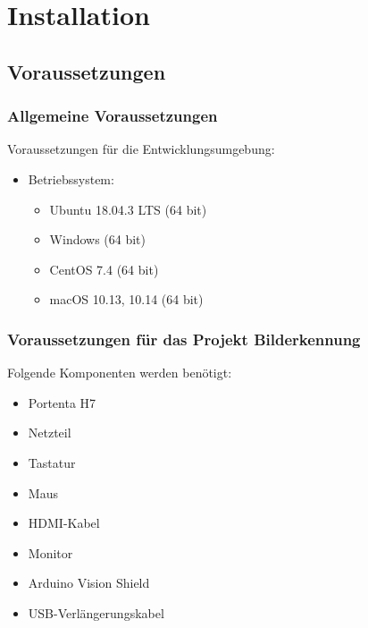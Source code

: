 %
%
%


\chapter{Installation}

\section{Voraussetzungen}

\subsection{Allgemeine Voraussetzungen}


Voraussetzungen für die Entwicklungsumgebung:
\begin{itemize}
  \item Betriebssystem:
    \begin{itemize}
    	\item Ubuntu 18.04.3 LTS (64 bit)
    	\item Windows (64 bit)
    	\item CentOS 7.4 (64 bit)
    	\item macOS 10.13, 10.14 (64 bit)
    \end{itemize}
\end{itemize}


\subsection{Voraussetzungen für das Projekt Bilderkennung}
	
Folgende Komponenten werden benötigt:
	
	\begin{itemize}
		\item Portenta H7
		\item Netzteil
		\item Tastatur
		\item Maus
		\item HDMI-Kabel
		\item Monitor
		\item Arduino Vision Shield
		\item USB-Verlängerungskabel
	\end{itemize}
	

